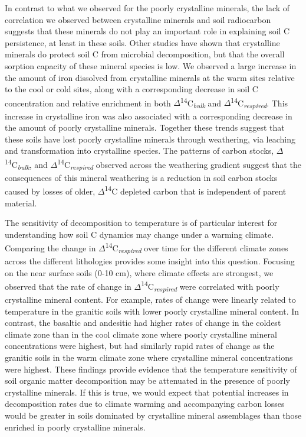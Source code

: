 \documentclass[english,man,floatsintext]{apa6}
\begin{document}
In contrast to what we observed for the poorly crystalline minerals, the lack of correlation we observed between crystalline minerals and soil radiocarbon suggests that these minerals do not play an important role in explaining soil C persistence, at least in these soils. Other studies have shown that crystalline minerals do protect soil C from microbial decomposition, but that the overall sorption capacity of these mineral species is low. We observed a large increase in the amount of iron dissolved from crystalline minerals at the warm sites relative to the cool or cold sites, along with a corresponding decrease in soil C concentration and relative enrichment in both \(\Delta\)\textsuperscript{14}C\textsubscript{\emph{bulk}} and \(\Delta\)\textsuperscript{14}C\textsubscript{\emph{respired}}. This increase in crystalline iron was also associated with a corresponding decrease in the amount of poorly crystalline minerals. Together these trends suggest that these soils have lost poorly crystalline minerals through weathering, via leaching and transformation into crystalline species. The patterns of carbon stocks, \(\Delta\)\textsuperscript{14}C\textsubscript{\emph{bulk}}, and \(\Delta\)\textsuperscript{14}C\textsubscript{\emph{respired}} observed across the weathering gradient suggest that the consequences of this mineral weathering is a reduction in soil carbon stocks caused by losses of older, \(\Delta\)\textsuperscript{14}C depleted carbon that is independent of parent material.

The sensitivity of decomposition to temperature is of particular interest for understanding how soil C dynamics may change under a warming climate. Comparing the change in \(\Delta\)\textsuperscript{14}C\textsubscript{\emph{respired}} over time for the different climate zones across the different lithologies provides some insight into this question. Focusing on the near surface soils (0-10 cm), where climate effects are strongest, we observed that the rate of change in \(\Delta\)\textsuperscript{14}C\textsubscript{\emph{respired}} were correlated with poorly crystalline mineral content. For example, rates of change were linearly related to temperature in the granitic soils with lower poorly crystalline mineral content. In contrast, the basaltic and andesitic had higher rates of change in the coldest climate zone than in the cool climate zone where poorly crystalline mineral concentrations were highest, but had similarly rapid rates of change as the granitic soils in the warm climate zone where crystalline mineral concentrations were highest. These findings provide evidence that the temperature sensitivity of soil organic matter decomposition may be attenuated in the presence of poorly crystalline minerals. If this is true, we would expect that potential increases in decomposition rates due to climate warming and accompanying carbon losses would be greater in soils dominated by crystalline mineral assemblages than those enriched in poorly crystalline minerals.
\end{document}
